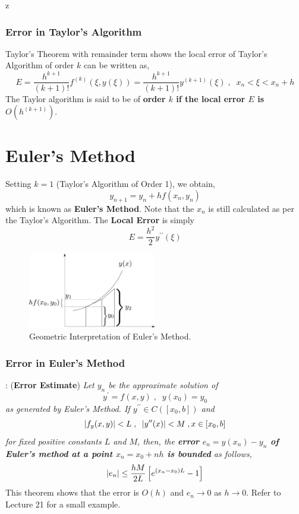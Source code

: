 z\documentclass[a4paper,12pt,twoside]{book}
\newcommand{\nll}[0]{\newline\newline}
\newcommand{\tit}[1]{\textit{#1}}
\newcommand{\theor}[1]{\boxed{\textbf{\textit{Theorem \thechapter.#1}}}}
\DeclarePairedDelimiter\abs{\lvert}{\rvert}
\renewcommand{\d}[0]{\prime}
\begin{document}
\subsubsection{Error in Taylor's Algorithm}
Taylor's Theorem with remainder term shows the local error of Taylor's Algorithm of order $k$ can be written as,
\begin{equation}
    E = \frac{h^{k+1}}{(k+1)!} f^{(k)}(\xi , y(\xi)) = \frac{h^{k+1}}{(k+1)!} y^{(k+1)}(\xi) \;,\;\;x_n < \xi < x_n + h
\end{equation}
The Taylor algorithm is said to be of \textbf{order $k$ if the local error $E$ is $O(h^{(k+1)})$}.
\section{Euler's Method}
Setting $k=1$ (Taylor's Algorithm of Order 1), we obtain,
\begin{equation}
    y_{n+1} = y_n + hf(x_n,y_n)
\end{equation}
which is known as \textbf{Euler's Method}. Note that the $x_n$ is still calculated as per the Taylor's Algorithm. The \textbf{Local Error} is simply
\begin{equation}
    E = \frac{h^2}{2}y^{\d\d}(\xi)
\end{equation}
\begin{figure}[h!]
    \centering
    \includegraphics[width=0.5\textwidth]{EulerMethodODE.pdf}
    \caption{Geometric Interpretation of Euler's Method.}
    \label{fig:EulerMethodODE}
\end{figure}
\newpage
\subsubsection{Error in Euler's Method}
\theor{14}  : (\textbf{Error Estimate}) \tit{Let $y_n$ be the approximate solution of \[y^\prime = f(x,y)\;,\;\;y(x_0) = y_0\]
as generated by Euler's Method. If $y^{\d\d} \in C([x_0,b])$ and
\[\abs*{f_y(x,y)} < L\;,\;\;\abs*{y^{\d\d}(x)} < M\;,x \in [x_0,b]\]
for fixed positive constants $L$ and $M$, then, the \textbf{error $e_n = y(x_n) - y_n$ of Euler's method at a point $x_n = x_0 + nh$ is bounded} as follows,
\[ \abs{e_n} \le \frac{hM}{2L} \left[ e^{(x_n-x_0)L} - 1 \right] \]
}
This theorem shows that the error is $O(h)$ and $e_n \to 0$ as $h\to 0$.
\nll
Refer to Lecture 21 for a small example.
\end{document}
